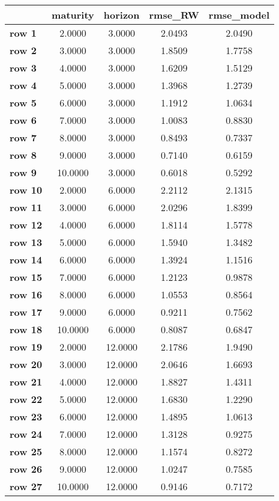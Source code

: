 \begin{tiny}\begin{tabular}{|l|c|c|c|c|}
\hline
&\textbf{maturity}&\textbf{horizon}&\textbf{rmse_RW}&\textbf{rmse_model}\\\hline
\textbf{row 1}&2.0000&3.0000&2.0493&2.0490\\\hline
\textbf{row 2}&3.0000&3.0000&1.8509&1.7758\\\hline
\textbf{row 3}&4.0000&3.0000&1.6209&1.5129\\\hline
\textbf{row 4}&5.0000&3.0000&1.3968&1.2739\\\hline
\textbf{row 5}&6.0000&3.0000&1.1912&1.0634\\\hline
\textbf{row 6}&7.0000&3.0000&1.0083&0.8830\\\hline
\textbf{row 7}&8.0000&3.0000&0.8493&0.7337\\\hline
\textbf{row 8}&9.0000&3.0000&0.7140&0.6159\\\hline
\textbf{row 9}&10.0000&3.0000&0.6018&0.5292\\\hline
\textbf{row 10}&2.0000&6.0000&2.2112&2.1315\\\hline
\textbf{row 11}&3.0000&6.0000&2.0296&1.8399\\\hline
\textbf{row 12}&4.0000&6.0000&1.8114&1.5778\\\hline
\textbf{row 13}&5.0000&6.0000&1.5940&1.3482\\\hline
\textbf{row 14}&6.0000&6.0000&1.3924&1.1516\\\hline
\textbf{row 15}&7.0000&6.0000&1.2123&0.9878\\\hline
\textbf{row 16}&8.0000&6.0000&1.0553&0.8564\\\hline
\textbf{row 17}&9.0000&6.0000&0.9211&0.7562\\\hline
\textbf{row 18}&10.0000&6.0000&0.8087&0.6847\\\hline
\textbf{row 19}&2.0000&12.0000&2.1786&1.9490\\\hline
\textbf{row 20}&3.0000&12.0000&2.0646&1.6693\\\hline
\textbf{row 21}&4.0000&12.0000&1.8827&1.4311\\\hline
\textbf{row 22}&5.0000&12.0000&1.6830&1.2290\\\hline
\textbf{row 23}&6.0000&12.0000&1.4895&1.0613\\\hline
\textbf{row 24}&7.0000&12.0000&1.3128&0.9275\\\hline
\textbf{row 25}&8.0000&12.0000&1.1574&0.8272\\\hline
\textbf{row 26}&9.0000&12.0000&1.0247&0.7585\\\hline
\textbf{row 27}&10.0000&12.0000&0.9146&0.7172\\\hline
\end{tabular}
\end{tiny}